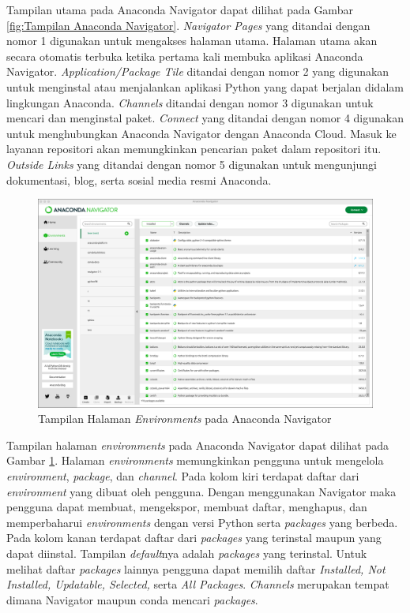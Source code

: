 Tampilan utama pada Anaconda Navigator dapat dilihat pada Gambar \ref{fig:Tampilan Anaconda Navigator}. \emph{Navigator Pages} yang ditandai dengan nomor 1 digunakan untuk mengakses halaman utama. Halaman utama akan secara otomatis terbuka ketika pertama kali membuka aplikasi Anaconda Navigator. \emph{Application/Package Tile} ditandai dengan nomor 2 yang digunakan untuk menginstal atau menjalankan aplikasi Python yang dapat berjalan didalam lingkungan Anaconda. \emph{Channels} ditandai dengan nomor 3 digunakan untuk mencari dan menginstal paket. \emph{Connect} yang ditandai dengan nomor 4 digunakan untuk menghubungkan Anaconda Navigator dengan Anaconda Cloud. Masuk ke layanan repositori akan memungkinkan pencarian paket dalam repositori itu. \emph{Outside Links} yang ditandai dengan nomor 5 digunakan untuk mengunjungi dokumentasi, blog, serta sosial media resmi Anaconda.

\begin{figure} [ht] \centering
    \includegraphics[scale=0.262]{gambar/AnacondaEnvironments.png}
    \caption{Tampilan Halaman \emph{Environments} pada Anaconda Navigator}
    \label{fig:Tampilan Anaconda Environments}
\end{figure}

Tampilan halaman \emph{environments} pada Anaconda Navigator dapat dilihat pada Gambar \ref{fig:Tampilan Anaconda Environments}. Halaman \emph{environments} memungkinkan pengguna untuk mengelola \emph{environment}, \emph{package}, dan \emph{channel}. Pada kolom kiri terdapat daftar dari \emph{environment} yang dibuat oleh pengguna. Dengan menggunakan Navigator maka pengguna dapat membuat, mengekspor, membuat daftar, menghapus, dan memperbaharui \emph{environments} dengan versi Python serta \emph{packages} yang berbeda. Pada kolom kanan terdapat daftar dari \emph{packages} yang terinstal maupun yang dapat diinstal. Tampilan \emph{default}nya adalah \emph{packages} yang terinstal. Untuk melihat daftar \emph{packages} lainnya pengguna dapat memilih daftar \emph{Installed, Not Installed, Updatable, Selected,} serta \emph{All Packages}. \emph{Channels} merupakan tempat dimana Navigator maupun conda mencari \emph{packages}.

